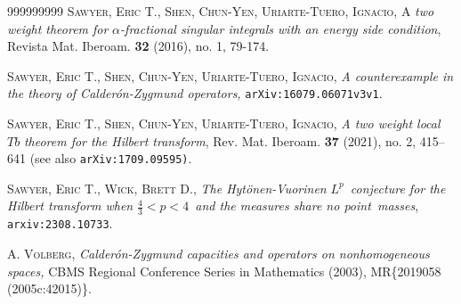 \documentclass{amsart}%
\theoremstyle{plain}
\numberwithin{equation}{section}
\begin{document}
\begin{thebibliography}{999999999}
\textsc{Sawyer, Eric T., Shen, Chun-Yen,
Uriarte-Tuero, Ignacio,} A \textit{two weight theorem for }$\alpha
$\textit{-fractional singular integrals with an energy side condition},
Revista Mat. Iberoam. \textbf{32} (2016), no. 1, 79-174.

\textsc{Sawyer, Eric T., Shen, Chun-Yen,
Uriarte-Tuero, Ignacio,} \textit{A counterexample in the theory of
Calder\'{o}n-Zygmund operators, }\texttt{arXiv:16079.06071v3v1}.

\textsc{Sawyer, Eric T., Shen, Chun-Yen,
Uriarte-Tuero, Ignacio, }\textit{A two weight local }$Tb$ \textit{theorem for
the Hilbert transform}, Rev. Mat. Iberoam. \textbf{37} (2021), no. 2, 415--641
(see also \texttt{arXiv:1709.09595)}.

\textsc{Sawyer, Eric T., Wick, Brett D., }\textit{The
Hyt\"{o}nen-Vuorinen }$L^{p}$\textit{\ conjecture for the Hilbert transform
when }$\frac{4}{3}<p<4$\textit{\ and the measures share no point\ masses},
\texttt{arxiv:2308.10733}.

\textsc{A. Volberg,} \textit{Calder\'{o}n-Zygmund capacities
and operators on nonhomogeneous spaces,} CBMS Regional Conference Series in
Mathematics (2003), MR\{2019058 (2005c:42015)\}.
\end{thebibliography}
\end{document}
